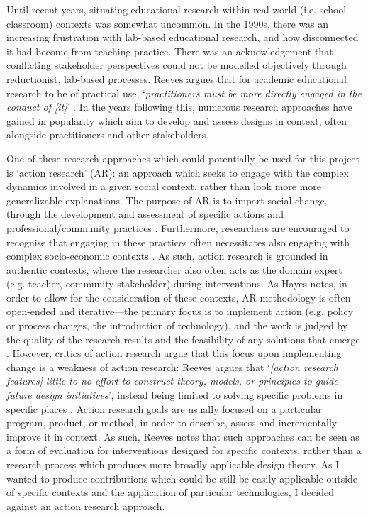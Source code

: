 Until recent years, situating educational research within real-world (i.e. school classroom) contexts was somewhat uncommon. In the 1990s, there was an increasing frustration with lab-based educational research, and how disconnected it had become from teaching practice. There was an acknowledgement that conflicting stakeholder perspectives could not be modelled objectively through reductionist, lab-based processes. Reeves argues that for academic educational research to be of practical use, `\textit{practitioners must be more directly engaged in the conduct of [it]}' \citep{reeves2000}. In the years following this, numerous research approaches have gained in popularity which aim to develop and assess designs in context, often alongside practitioners and other stakeholders. 

One of these research approaches which could potentially be used for this project is `action research' (AR): an approach which seeks to engage with the complex dynamics involved in a given social context, rather than look more more generalizable explanations. The purpose of AR is to impart social change, through the development and assessment of specific actions and professional/community practices \citep{macdonald2012}. Furthermore, researchers are encouraged to recognise that engaging in these practices often necessitates also engaging with complex socio-economic contexts \citep{stringer2013}. As such, action research is grounded in authentic contexts, where the researcher also often acts as the domain expert (e.g. teacher, community stakeholder) during interventions. As Hayes notes, in order to allow for the consideration of these contexts, AR methodology is often open-ended and iterative---the primary focus is to implement action (e.g. policy or process changes, the introduction of technology), and the work is judged by the quality of the research results and the feasibility of any solutions that emerge \citep{hayes2011}. However, critics of action research argue that this focus upon implementing change is a weakness of action research: Reeves argues that `\textit{[action research features] little to no effort to construct theory, models, or principles to guide future design initiatives}', instead being limited to solving specific problems in specific places \citep{reeves2000}. Action research goals are usually focused on a particular program, product, or method, in order to describe, assess and incrementally improve it in context. As such, Reeves notes that such approaches can be seen as a form of evaluation for interventions designed for specific contexts, rather than a research process which produces more broadly applicable design theory. As I wanted to produce contributions which could be still be easily applicable outside of specific contexts and the application of particular technologies, I decided against an action research approach.

